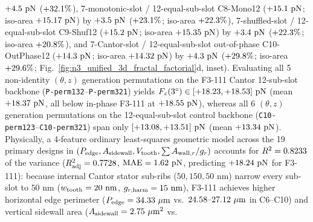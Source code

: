 \documentclass[pdflatex,sn-nature]{sn-jnl}
\DeclareRobustCommand{\roundone}[1]{\fpeval{round(#1,1)}}
\DeclareRobustCommand{\roundtwo}[1]{\fpeval{round(#1,2)}}
\DeclareRobustCommand{\roundfour}[1]{\fpeval{round(#1,4)}}
\begin{document}
$+\roundone{\NthreeUnithreedGainFoneoneoneVsLinonetwoPn}\text{ pN}$ ($+\roundone{\NthreeUnithreedGainFoneoneoneVsLinonetwoPct}\%$), 7-monotonic-slot / 12-equal-sub-slot C8-Mono12 ($+\roundone{\NthreeUnithreedCtrlMonoonetwoFzPn}\text{ pN}$; iso-area $+\roundtwo{\NthreeIsothreezerofournineCtrlMonoonetwoFzPn}\text{ pN}$) by $+\roundone{\NthreeUnithreedGainFoneoneoneVsMonoonetwoPn}\text{ pN}$ ($+\roundone{\NthreeUnithreedGainFoneoneoneVsMonoonetwoPct}\%$; iso-area $+\roundone{\NthreeIsothreezerofournineGainFoneoneoneVsMonoonetwoPct}\%$), 7-shuffled-slot / 12-equal-sub-slot C9-Shuf12 ($+\roundone{\NthreeUnithreedCtrlShufonetwoFzPn}\text{ pN}$; iso-area $+\roundtwo{\NthreeIsothreezerofournineCtrlShufonetwoFzPn}\text{ pN}$) by $+\roundone{\NthreeUnithreedGainFoneoneoneVsShufonetwoPn}\text{ pN}$ ($+\roundone{\NthreeUnithreedGainFoneoneoneVsShufonetwoPct}\%$; iso-area $+\roundone{\NthreeIsothreezerofournineGainFoneoneoneVsShufonetwoPct}\%$), and 7-Cantor-slot / 12-equal-sub-slot out-of-phase C10-OutPhase12 ($+\roundone{\NthreeUnithreedCtrlOutphaseonetwoFzPn}\text{ pN}$; iso-area $+\roundtwo{\NthreeIsothreezerofournineCtrlOutphaseonetwoFzPn}\text{ pN}$) by $+\roundone{\NthreeUnithreedGainFoneoneoneVsOutphaseonetwoPn}\text{ pN}$ ($+\roundone{\NthreeUnithreedGainFoneoneoneVsOutphaseonetwoPct}\%$; iso-area $+\roundone{\NthreeIsothreezerofournineGainFoneoneoneVsOutphaseonetwoPct}\%$; Fig.~\ref{fig:n3_unified_3d_fractal_factorial}d, inset). Evaluating all 5 non-identity $(\theta, z)$ generation permutations on the F3-111 Cantor 12-sub-slot backbone (\texttt{P-perm132}--\texttt{P-perm321}) yields $F_z(3^\circ) \in [+\roundtwo{\NthreePermCantorMinFzPn}, +\roundtwo{\NthreePermCantorMaxFzPn}]\text{ pN}$ (mean $+\roundtwo{\NthreePermCantorMeanFzPn}\text{ pN}$, all below in-phase F3-111 at $+\roundtwo{\NthreeUnithreedFoneoneoneUnifiedFzPn}\text{ pN}$), whereas all 6 $(\theta, z)$ generation permutations on the 12-equal-sub-slot control backbone (\texttt{C10-perm123}--\texttt{C10-perm321}) span only $[+\roundtwo{\NthreePermConezeroMinFzPn}, +\roundtwo{\NthreePermConezeroMaxFzPn}]\text{ pN}$ (mean $+\roundtwo{\NthreePermConezeroMeanFzPn}\text{ pN}$). Physically, a 4-feature ordinary least-squares geometric model across the 19 primary designs in $(P_{\rm edge}, A_{\rm sidewall}, V_{\rm tooth}, \sum A_{{\rm wall},r}/g_r)$ accounts for $R^2 = \roundfour{\NthreeUnithreedGeomModelRtwoFull}$ of the variance ($R^2_{\rm adj} = \roundfour{\NthreeUnithreedGeomModelRtwoAdjFull}$, $\mathrm{MAE} = \roundtwo{\NthreeUnithreedGeomModelMaeFullPn}\text{ pN}$, predicting $+\roundtwo{\NthreeUnithreedGeomModelFoneoneonePredPn}\text{ pN}$ for F3-111): because internal Cantor stator sub-ribs ($50, 150, 50\text{ nm}$) narrow every sub-slot to $50\text{ nm}$ ($w_{\rm tooth} = 20\text{ nm}$, $g_{r,\rm harm} = \roundone{\NthreeUnithreedFoneoneoneUnifiedGrHarmNm}\text{ nm}$), F3-111 achieves higher horizontal edge perimeter ($P_{\rm edge} = \roundtwo{\NthreeUnithreedFoneoneoneUnifiedPedgeUm}\ \mu\text{m}$ vs.\ $\roundtwo{\NthreeUnithreedCtrlLinonetwoPedgeUm}\text{--}\roundtwo{\NthreeUnithreedCtrlShufonetwoPedgeUm}\ \mu\text{m}$ in C6--C10) and vertical sidewall area ($A_{\rm sidewall} = \roundtwo{\NthreeUnithreedFoneoneoneUnifiedAswUmtwo}\ \mu\text{m}^2$ vs.\ 
\end{document}

